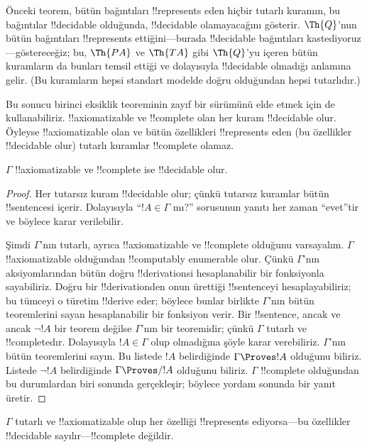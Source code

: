\begin{explain}
Önceki teorem, bütün bağıntıları !!{represents} eden hiçbir tutarlı kuramın,
bu bağıntılar !!{decidable} olduğunda, !!{decidable} olamayacağını gösterir.
$\Th{Q}$'nun bütün bağıntıları !!{represents} ettiğini---burada
!!{decidable} bağıntıları kastediyoruz---göstereceğiz; bu,
$\Th{PA}$ ve $\Th{TA}$ gibi $\Th{Q}$'yu içeren bütün kuramların da bunları
temsil ettiği ve dolayısıyla !!{decidable} olmadığı anlamına gelir.
(Bu kuramların hepsi standart modelde doğru olduğundan hepsi tutarlıdır.)

Bu sonucu birinci eksiklik teoreminin zayıf bir sürümünü elde etmek için de
kullanabiliriz. !!{axiomatizable} ve !!{complete} olan her kuram
!!{decidable} olur. Öyleyse !!{axiomatizable} olan ve bütün özellikleri
!!{represents} eden (bu özellikler !!{decidable} olur) tutarlı kuramlar
!!{complete} olamaz.
\end{explain}

\begin{thm}
$\Gamma$ !!{axiomatizable} ve !!{complete} ise !!{decidable} olur.
\end{thm}

\begin{proof}
Her tutarsız kuram !!{decidable} olur; çünkü tutarsız kuramlar bütün
!!{sentence}s{}i içerir. Dolayısıyla ``$!A \in \Gamma$ mı?'' sorusunun
yanıtı her zaman ``evet''tir ve böylece karar verilebilir.

Şimdi $\Gamma$'nın tutarlı, ayrıca !!{axiomatizable} ve !!{complete}
olduğunu varsayalım. $\Gamma$ !!{axiomatizable} olduğundan
!!{computably enumerable} olur. Çünkü $\Gamma$'nın aksiyomlarından bütün
doğru !!{derivation}s{}i hesaplanabilir bir fonksiyonla sayabiliriz. Doğru
bir !!{derivation}{}den onun ürettiği !!{sentence}{}yi hesaplayabiliriz; bu
tümceyi o türetim !!{derive} eder;
böylece bunlar birlikte $\Gamma$'nın bütün teoremlerini sayan hesaplanabilir
bir fonksiyon verir. Bir !!{sentence}, ancak ve ancak $\lnot !A$ bir teorem
değilse $\Gamma$'nın bir teoremidir; çünkü $\Gamma$ tutarlı ve
!!{complete}{}dır. Dolayısıyla $!A \in \Gamma$ olup olmadığına şöyle karar
verebiliriz. $\Gamma$'nın bütün teoremlerini sayın. Bu listede $!A$
belirdiğinde $\Gamma \Proves !A$ olduğunu biliriz. Listede $\lnot !A$
belirdiğinde $\Gamma \Proves/ !A$ olduğunu biliriz. $\Gamma$ !!{complete}
olduğundan bu durumlardan biri sonunda gerçekleşir; böylece yordam sonunda
bir yanıt üretir.
\end{proof}

\begin{cor}
$\Gamma$ tutarlı ve !!{axiomatizable} olup her özelliği !!{represents}
ediyorsa---bu özellikler !!{decidable} sayılır---!!{complete} değildir.
\end{cor}

